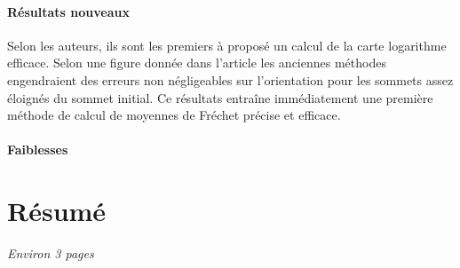 \documentclass[11pt]{article}
\begin{document}
	\paragraph{Résultats nouveaux}
	Selon les auteurs, ils sont les premiers à proposé un calcul de la carte logarithme efficace. Selon une figure donnée dans l'article les anciennes méthodes engendraient des erreurs non négligeables sur l'orientation pour les sommets assez éloignés du sommet initial. Ce résultats entraîne immédiatement une première méthode de calcul de moyennes de Fréchet précise et efficace.
	
	\paragraph{Faiblesses}
	
	\section{Résumé}
	
	\emph{Environ 3 pages} \\
	
\end{document}
